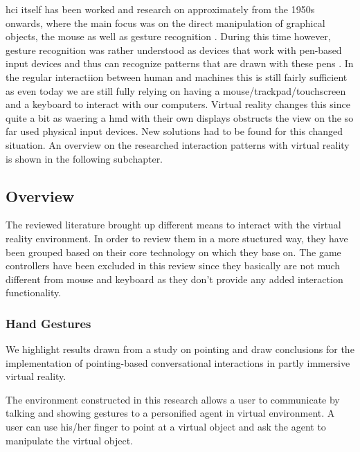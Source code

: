 \gls{hci} itself has been worked and research on approximately from the 1950s onwards, where the main focus was on the direct manipulation of graphical objects, the mouse as well as gesture recognition \citep{Myers1998}. During this time however, gesture recognition was rather understood as devices that work with pen-based input devices and thus can recognize patterns that are drawn with these pens \citep{Myers1998}. In the regular interactiion between human and machines this is still fairly sufficient as even today we are still fully relying on having a mouse/trackpad/touchscreen and a keyboard to interact with our computers. \newline
Virtual reality changes this since quite a bit as waering a \gls{hmd} with their own displays obstructs the view on the so far used physical input devices. New solutions had to be found for this changed situation. An overview on the researched interaction patterns with virtual reality is shown in the following subchapter.



\subsection{Overview}

The reviewed literature brought up different means to interact with the virtual reality environment. In order to review them in a more stuctured way, they have been grouped based on their core technology on which they base on. The game controllers have been excluded in this review since they basically are not much different from mouse and keyboard as they don't provide any added interaction functionality.


\subsubsection{Hand Gestures}



We highlight results drawn from a study on pointing and draw conclusions for the implementation of pointing-based conversational interactions in partly immersive virtual reality.
\cite{Pfeiffer2008}

The environment constructed in this research allows a user to communicate by talking and showing gestures
to a personified agent in virtual environment. A user can use his/her finger to point at a virtual object and ask the agent to manipulate the virtual object.
\cite{Uchino2008}

